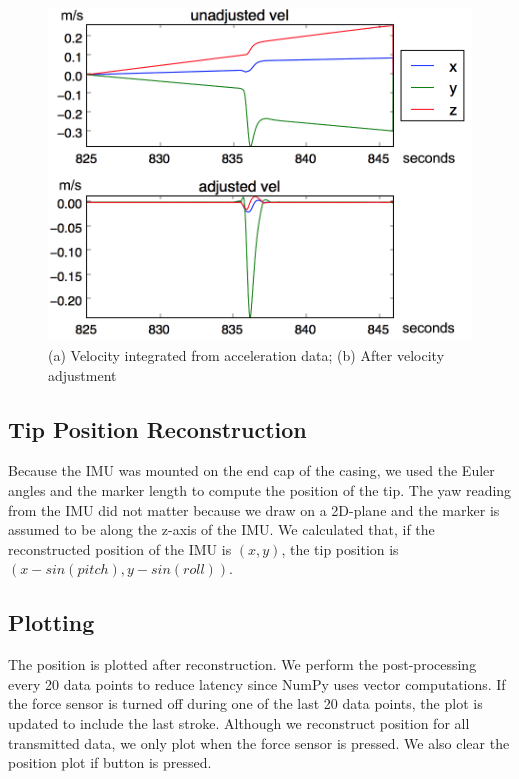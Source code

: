 \documentclass[10pt,journal]{IEEEtran}
\begin{document}
\begin{figure}[h]
  \centering
    \includegraphics[width=0.9\linewidth]{figures/vel-adjust}
  \caption{(a) Velocity integrated from acceleration data; (b) After velocity adjustment}
  \label{fig:vel-adjust}
\end{figure}

\subsection{Tip Position Reconstruction}
Because the IMU was mounted on the end cap of the casing, we used the Euler angles and the marker length to compute the position of the tip. The yaw reading from the IMU did not matter because we draw on a 2D-plane and the marker is assumed to be along the z-axis of the IMU. We calculated that, if the reconstructed position of the IMU is $(x,y)$, the tip position is $(x-sin(pitch), y-sin(roll))$.

\subsection{Plotting}
  The position is plotted after reconstruction. We perform the post-processing every 20 data points to reduce latency since NumPy uses vector computations. If the force sensor is turned off during one of the last 20 data points, the plot is updated to include the last stroke. Although we reconstruct position for all transmitted data, we only plot when the force sensor is pressed. We also clear the position plot if button is pressed. 
\end{document}
